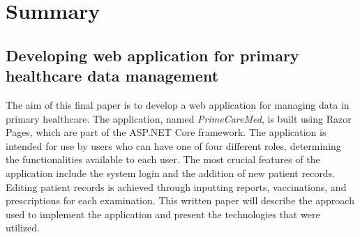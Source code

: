 \section*{Summary}
\subsection*{Developing web application for primary healthcare data management}
The aim of this final paper is to develop a web application for managing data in primary healthcare. The application, named \textit{PrimeCareMed}, is built using Razor Pages, which are part of the ASP.NET Core framework. The application is intended for use by users who can have one of four different roles, determining the functionalities available to each user. The most crucial features of the application include the system login and the addition of new patient records. Editing patient records is achieved through inputting reports, vaccinations, and prescriptions for each examination. This written paper will describe the approach used to implement the application and present the technologies that were utilized.
